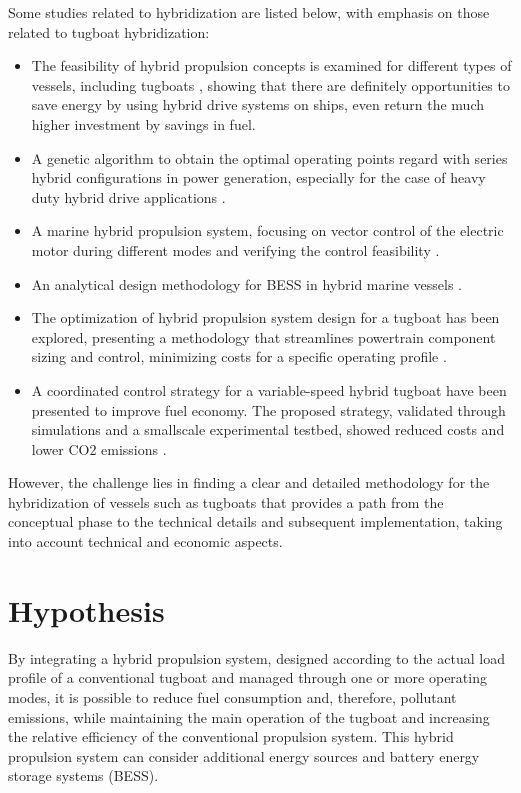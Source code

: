 Some studies related to hybridization are listed below, with emphasis on those related to tugboat hybridization:
\begin{itemize}
	\item The feasibility of hybrid propulsion concepts is examined for different types of vessels, including tugboats \cite{Volker}, showing that there are definitely opportunities to save energy by using hybrid drive systems on ships, even return the much higher investment by savings in fuel.
	\item A genetic algorithm to obtain the optimal operating points regard with series hybrid configurations in power generation, especially for the case of heavy duty hybrid drive applications \cite{Bauer}.
	\item A marine hybrid propulsion system, focusing on vector control of the electric motor during different modes and verifying the control feasibility \cite{ZFan}.
	\item An analytical design methodology for BESS in
hybrid marine vessels \cite{Barrera}.
	\item The optimization of hybrid propulsion system design for a tugboat has been explored, presenting a methodology that streamlines powertrain component sizing and control, minimizing costs for a specific operating profile \cite{Hofman}.
	\item A coordinated control strategy for a variable-speed hybrid tugboat have been presented to improve fuel economy. The proposed strategy, validated through simulations and a smallscale
experimental testbed, showed reduced costs and lower
CO2 emissions \cite{Kumar}.
\end{itemize}
    
However, the challenge lies in finding a clear and detailed methodology for the hybridization of vessels such as tugboats that provides a path from the conceptual phase to the technical details and subsequent implementation, taking into account technical and economic aspects.

\section{Hypothesis}

By integrating a hybrid propulsion system, designed according to the actual load profile of a conventional tugboat and managed through one or more operating modes, it is possible to reduce fuel consumption and, therefore, pollutant emissions, while maintaining the main operation of the tugboat and increasing the relative efficiency of the conventional propulsion system.
This hybrid propulsion system can consider additional energy sources and battery energy storage systems (BESS).



